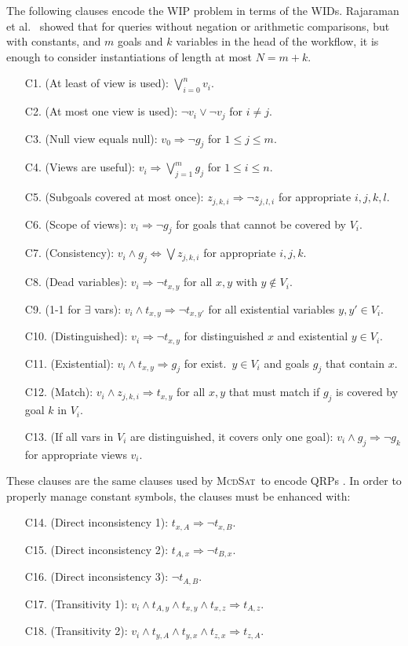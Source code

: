 \documentclass{llncs}
\newcommand{\mcdsat}{\textsc{McdSat}}
\begin{document}
The following clauses encode the WIP problem in terms of the WIDs.
Rajaraman et al.\ \cite{RajaramanSU95} showed that for queries without negation or
arithmetic comparisons, but with constants, and $m$ goals and $k$ variables in the
head of the workflow, it is enough to consider instantiations of length at most $N=m+k$.
\begin{enumerate}[C10.]
\item[C1.] (At least of view is used): $\bigvee_{i=0}^n v_i$.
\item[C2.] (At most one view is used): $\neg v_i\lor\neg v_j$ for $i\neq j$.
\item[C3.] (Null view equals null): $v_0 \Rightarrow \neg g_j$ for $1\leq j\leq m$.
\item[C4.] (Views are useful): $v_i \Rightarrow \bigvee_{j=1}^m g_j$ for $1\leq i\leq n$.
\item[C5.] (Subgoals covered at most once): $z_{j,k,i} \Rightarrow \neg z_{j,l,i}$ for appropriate $i,j,k,l$.
\item[C6.] (Scope of views): $v_i \Rightarrow \neg g_j$ for goals that cannot be covered by $V_i$.
\item[C7.] (Consistency): $v_i \land g_j \Leftrightarrow \bigvee z_{j,k,i}$ for appropriate $i,j,k$.
\item[C8.] (Dead variables): $v_i \Rightarrow \neg t_{x,y}$ for all $x,y$ with $y\notin V_i$.
\item[C9.] (1-1 for $\exists$ vars): $v_i \land t_{x,y} \Rightarrow \neg t_{x,y'}$ for all
           existential variables $y,y'\in V_i$.
\item[C10.] (Distinguished): $v_i \Rightarrow \neg t_{x,y}$ for distinguished $x$ and existential
            $y\in V_i$.
\item[C11.] (Existential): $v_i\land t_{x,y}\Rightarrow g_j$ for exist.\ $y\in V_i$ and
            goals $g_j$ that contain $x$.
\item[C12.] (Match): $v_i\land z_{j,k,i} \Rightarrow t_{x,y}$ for all $x,y$ that must match
            if $g_j$ is covered by goal $k$ in $V_i$.
\item[C13.] (If all vars in $V_i$ are distinguished, it covers only one goal):
            $v_i \land g_j \Rightarrow \neg g_k$ for appropriate views $v_i$.
\end{enumerate}
These clauses are the same clauses used by \mcdsat\ to encode QRPs \cite{arvelo:aaai06}.
In order to properly manage constant symbols, the clauses must be enhanced with:
\begin{enumerate}[C10.]
\item[C14.] (Direct inconsistency 1): $t_{x,A} \Rightarrow \neg t_{x,B}$.
\item[C15.] (Direct inconsistency 2): $t_{A,x} \Rightarrow \neg t_{B,x}$.
\item[C16.] (Direct inconsistency 3): $\neg t_{A,B}$.
\item[C17.] (Transitivity 1): $v_i\land t_{A,y}\land t_{x,y}\land t_{x,z}\Rightarrow t_{A,z}$.
\item[C18.] (Transitivity 2): $v_i\land t_{y,A}\land t_{y,x}\land t_{z,x}\Rightarrow t_{z,A}$.
\end{enumerate}
\end{document}
